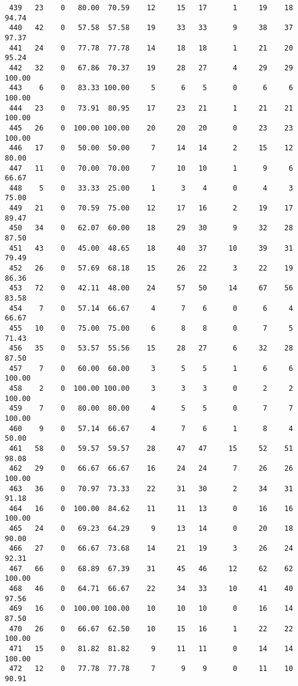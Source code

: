 \begin{verbatim}
 439   23    0   80.00  70.59    12     15   17      1     19    18    94.74
 440   42    0   57.58  57.58    19     33   33      9     38    37    97.37
 441   24    0   77.78  77.78    14     18   18      1     21    20    95.24
 442   32    0   67.86  70.37    19     28   27      4     29    29   100.00
 443    6    0   83.33 100.00     5      6    5      0      6     6   100.00
 444   23    0   73.91  80.95    17     23   21      1     21    21   100.00
 445   26    0  100.00 100.00    20     20   20      0     23    23   100.00
 446   17    0   50.00  50.00     7     14   14      2     15    12    80.00
 447   11    0   70.00  70.00     7     10   10      1      9     6    66.67
 448    5    0   33.33  25.00     1      3    4      0      4     3    75.00
 449   21    0   70.59  75.00    12     17   16      2     19    17    89.47
 450   34    0   62.07  60.00    18     29   30      9     32    28    87.50
 451   43    0   45.00  48.65    18     40   37     10     39    31    79.49
 452   26    0   57.69  68.18    15     26   22      3     22    19    86.36
 453   72    0   42.11  48.00    24     57   50     14     67    56    83.58
 454    7    0   57.14  66.67     4      7    6      0      6     4    66.67
 455   10    0   75.00  75.00     6      8    8      0      7     5    71.43
 456   35    0   53.57  55.56    15     28   27      6     32    28    87.50
 457    7    0   60.00  60.00     3      5    5      1      6     6   100.00
 458    2    0  100.00 100.00     3      3    3      0      2     2   100.00
 459    7    0   80.00  80.00     4      5    5      0      7     7   100.00
 460    9    0   57.14  66.67     4      7    6      1      8     4    50.00
 461   58    0   59.57  59.57    28     47   47     15     52    51    98.08
 462   29    0   66.67  66.67    16     24   24      7     26    26   100.00
 463   36    0   70.97  73.33    22     31   30      2     34    31    91.18
 464   16    0  100.00  84.62    11     11   13      0     16    16   100.00
 465   24    0   69.23  64.29     9     13   14      0     20    18    90.00
 466   27    0   66.67  73.68    14     21   19      3     26    24    92.31
 467   66    0   68.89  67.39    31     45   46     12     62    62   100.00
 468   46    0   64.71  66.67    22     34   33     10     41    40    97.56
 469   16    0  100.00 100.00    10     10   10      0     16    14    87.50
 470   26    0   66.67  62.50    10     15   16      1     22    22   100.00
 471   15    0   81.82  81.82     9     11   11      0     14    14   100.00
 472   12    0   77.78  77.78     7      9    9      0     11    10    90.91

\end{verbatim}
